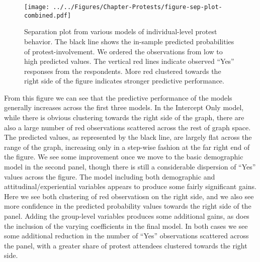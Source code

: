 \begin{figure}[t]
	\centering\texttt{[image: ../../Figures/Chapter-Protests/figure-sep-plot-combined.pdf]}
	\caption{Separation plot from various models of individual-level protest behavior. The black line shows the in-sample predicted probabilities of protest-involvement. We ordered the observations from low to high predicted values. The vertical red lines indicate observed ``Yes'' responses from the respondents. More red clustered towards the right side of the figure indicates stronger predictive performance.}
	\label{fig:sepplotcombined}
\end{figure}

From this figure we can see that the predictive performance of the models generally increases across the first three models. In the Intercept Only model, while there is obvious clustering towards the right side of the graph, there are also a large number of red observations scattered across the rest of graph space. The predicted values, as represented by the black line, are largely flat across the range of the graph, increasing only in a step-wise fashion at the far right end of the figure. We see some improvement once we move to the basic demographic model in the second panel, though there is still a considerable dispersion of ``Yes'' values across the figure. The model including both demographic and attitudinal/experiential variables appears to produce some fairly significant gains. Here we see both clustering of red observatiosn on the right side, and we also see more confidence in the predicted probability values towards the right side of the panel. Adding the group-level variables produces some additional gains, as does the inclusion of the varying coefficients in the final model. In both cases we see some additional reduction in the number of ``Yes'' observations scattered across the panel, with a greater share of protest attendees clustered towards the right side. 



